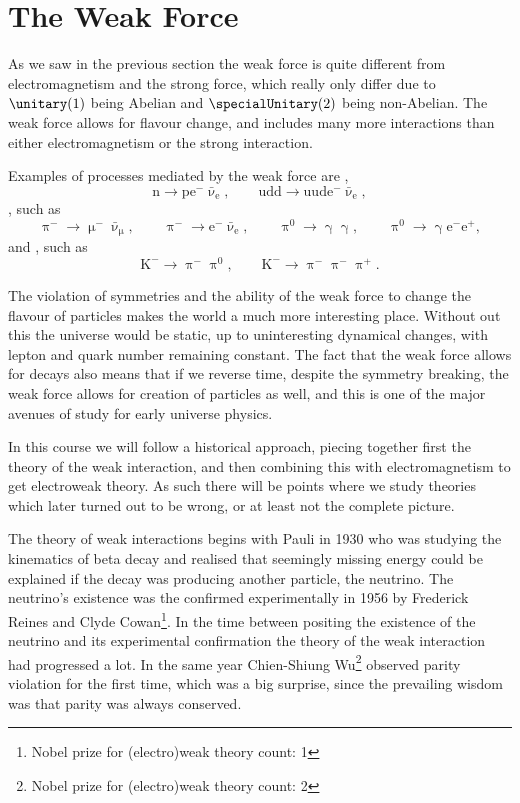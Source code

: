 \documentclass[fleqn]{NotesClass}
\newcommand{\Pparticle}[1]{\mathrm{#1}}
\newcommand{\Pphoton}{\ensuremath{\upgamma}}
\newcommand{\Pu}{\ensuremath{\Pparticle{u}}}
\newcommand{\Pd}{\ensuremath{\Pparticle{d}}}
\newcommand{\Pe}{\ensuremath{\Pparticle{e}^{-}}}
\newcommand{\Pmu}{\ensuremath{\upmu^{-}}}
\newcommand{\Ppip}{\ensuremath{\uppi^{+}}}
\newcommand{\Ppim}{\ensuremath{\uppi^{-}}}
\newcommand{\Ppizero}{\ensuremath{\uppi^{0}}}
\newcommand{\Pproton}{\ensuremath{\Pparticle{p}}}
\newcommand{\Pneutron}{\ensuremath{\Pparticle{n}}}
\newcommand{\PKm}{\ensuremath{\Pparticle{K}^-}}
\newcommand{\APantiparticle}[1]{\bar{#1}}
\newcommand{\APe}{\ensuremath{\Pparticle{e}^{+}}}
\newcommand{\APnue}{\ensuremath{\APantiparticle{\upnu}_{\mathrm{e}}}}
\newcommand{\APnumu}{\ensuremath{\APantiparticle{\upnu}_{\text{μ}}}}
\begin{document}
    \section{The Weak Force}
    As we saw in the previous section the weak force is quite different from electromagnetism and the strong force, which really only differ due to \(\unitary(1)\) being Abelian and \(\specialUnitary(2)\) being non-Abelian.
    The weak force allows for flavour change, and includes many more interactions than either electromagnetism or the strong interaction.
    
    Examples of processes mediated by the weak force are ,
    \begin{equation}
        \Pneutron \to \Pproton \Pe \APnue, \qquad \Pu\Pd\Pd \to \Pu\Pu\Pd \Pe \APnue,
    \end{equation}
    , such as
    \begin{equation}
        \Ppim \to \Pmu\APnumu, \qquad \Ppim \to \Pe\APnue, \qquad \Ppizero \to \Pphoton\Pphoton, \qquad \Ppizero \to \Pphoton \Pe \APe,
    \end{equation}
    and , such as
    \begin{equation}
        \PKm \to \Ppim \Ppizero, \qquad \PKm \to \Ppim \Ppim \Ppip.
    \end{equation}
    
    The violation of symmetries and the ability of the weak force to change the flavour of particles makes the world a much more interesting place.
    Without out this the universe would be static, up to uninteresting dynamical changes, with lepton and quark number remaining constant.
    The fact that the weak force allows for decays also means that if we reverse time, despite the symmetry breaking, the weak force allows for creation of particles as well, and this is one of the major avenues of study for early universe physics.
    
    In this course we will follow a historical approach, piecing together first the theory of the weak interaction, and then combining this with electromagnetism to get electroweak theory.
    As such there will be points where we study theories which later turned out to be wrong, or at least not the complete picture.
    
    The theory of weak interactions begins with Pauli in 1930 who was studying the kinematics of beta decay and realised that seemingly missing energy could be explained if the decay was producing another particle, the neutrino.
    The neutrino's existence was the confirmed experimentally in 1956 by Frederick Reines and Clyde Cowan\footnote{Nobel prize for (electro)weak theory count: 1}.
    In the time between positing the existence of the neutrino and its experimental confirmation the theory of the weak interaction had progressed a lot.
    In the same year Chien-Shiung Wu\footnote{Nobel prize for (electro)weak theory count: 2} observed parity violation for the first time, which was a big surprise, since the prevailing wisdom was that parity was always conserved.
    
\end{document}
